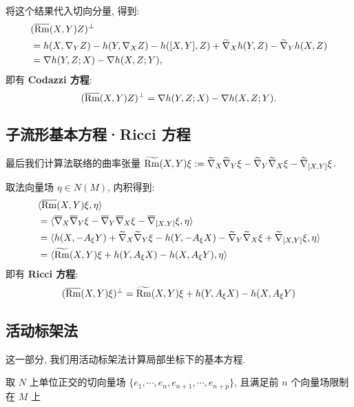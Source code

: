 \documentclass{ctexart}
\begin{document}
将这个结果代入切向分量, 得到:
\begin{align*}
	&(\overline{\mathrm{Rm}}(X, Y)Z)^{\perp} \\
	&= h(X, \nabla_{Y}{Z}) - h(Y, \nabla_{X}{Z}) - h([X, Y], Z) + \widetilde{\nabla}_{X}{h(Y, Z)} - \widetilde{\nabla}_{Y}{h(X, Z)} \\
	&= \nabla h(Y, Z; X) - \nabla h(X, Z; Y),
\end{align*}
即有 {\bf Codazzi 方程}:
\begin{equation}\label{eq::Codazzi-equation}
	(\overline{\mathrm{Rm}}(X, Y)Z)^{\perp} = \nabla h(Y, Z; X) - \nabla h(X, Z; Y).
\end{equation}

\subsection{子流形基本方程·Ricci 方程}
最后我们计算法联络的曲率张量 $\widetilde{\mathrm{Rm}}(X, Y)\xi := \widetilde{\nabla}_{X}{\widetilde{\nabla}_{Y}{\xi}} - \widetilde{\nabla}_{Y}{\widetilde{\nabla}_{X}{\xi}} - \widetilde{\nabla}_{[X, Y]}{\xi}$.

取法向量场 $\eta \in N(M)$, 内积得到:
\begin{align*}
	&\langle {\overline{\mathrm{Rm}}(X, Y)\xi}, {\eta} \rangle \\
	&= \langle {\overline{\nabla}_{X}{\overline{\nabla}_{Y}{\xi}} - \overline{\nabla}_{Y}{\overline{\nabla}_{X}{\xi}} - \overline{\nabla}_{[X, Y]}{\xi}}, {\eta} \rangle \\
	&= \langle {h(X, -A_{\xi}{Y}) + \widetilde{\nabla}_{X}{\widetilde{\nabla}_{Y}{\xi}} - h(Y, -A_{\xi}{X}) - \widetilde{\nabla}_{Y}{\widetilde{\nabla}_{X}{\xi}} + \widetilde{\nabla}_{[X, Y]}{\xi}}, {\eta} \rangle \\
	&= \langle {\widetilde{\mathrm{Rm}}(X, Y)\xi + h(Y, A_{\xi}{X}) - h(X, A_{\xi}{Y})}, {\eta} \rangle \\
\end{align*}
即有 {\bf Ricci 方程}:
\begin{equation}\label{eq::Ricci-equation}
	(\overline{\mathrm{Rm}}(X, Y)\xi)^{\perp} = \widetilde{\mathrm{Rm}}(X, Y)\xi + h(Y, A_{\xi}{X}) - h(X, A_{\xi}{Y})
\end{equation}

\subsection{活动标架法}
这一部分, 我们用活动标架法计算局部坐标下的基本方程.

取 $N$ 上单位正交的切向量场 $\{e_1, \cdots, e_n, e_{n + 1}, \cdots, e_{n + p}\}$, 且满足前 $n$ 个向量场限制在 $M$ 上
\end{document}
